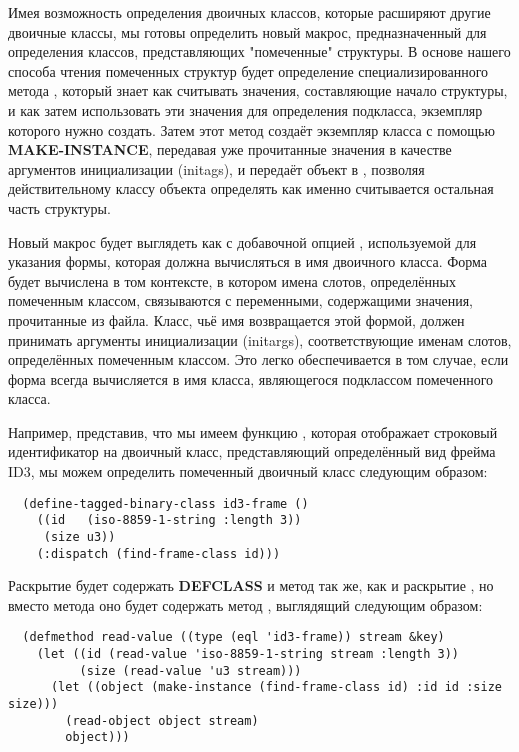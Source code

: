 Имея возможность определения двоичных классов, которые расширяют другие двоичные классы,
мы готовы определить новый макрос, предназначенный для определения классов, представляющих
"помеченные" структуры. В основе нашего способа чтения помеченных структур будет
определение специализированного метода , который знает как считывать
значения, составляющие начало структуры, и как затем использовать эти значения для
определения подкласса, экземпляр которого нужно создать. Затем этот метод создаёт
экземпляр класса с помощью \textbf{MAKE-INSTANCE}, передавая уже прочитанные значения в
качестве аргументов инициализации (initags), и передаёт объект в ,
позволяя действительному классу объекта определять как именно считывается остальная часть
структуры.

Новый макрос  будет выглядеть как
 с добавочной опцией , используемой для указания
формы, которая должна вычисляться в имя двоичного класса. Форма  будет
вычислена в том контексте, в котором имена слотов, определённых помеченным классом,
связываются с переменными, содержащими значения, прочитанные из файла. Класс, чьё имя
возвращается этой формой, должен принимать аргументы инициализации (initargs),
соответствующие именам слотов, определённых помеченным классом. Это легко обеспечивается в
том случае, если форма  всегда вычисляется в имя класса, являющегося
подклассом помеченного класса.

Например, представив, что мы имеем функцию , которая отображает
строковый идентификатор на двоичный класс, представляющий определённый вид фрейма ID3, мы
можем определить помеченный двоичный класс  следующим образом:

\begin{lstlisting}
  (define-tagged-binary-class id3-frame ()
    ((id   (iso-8859-1-string :length 3))
     (size u3))
    (:dispatch (find-frame-class id)))
\end{lstlisting}

Раскрытие  будет содержать \textbf{DEFCLASS} и метод  так же, как и раскрытие , но вместо метода  оно будет содержать метод , выглядящий следующим образом:

\begin{lstlisting}
  (defmethod read-value ((type (eql 'id3-frame)) stream &key)
    (let ((id (read-value 'iso-8859-1-string stream :length 3))
          (size (read-value 'u3 stream)))
      (let ((object (make-instance (find-frame-class id) :id id :size size)))
        (read-object object stream)
        object)))
\end{lstlisting}

